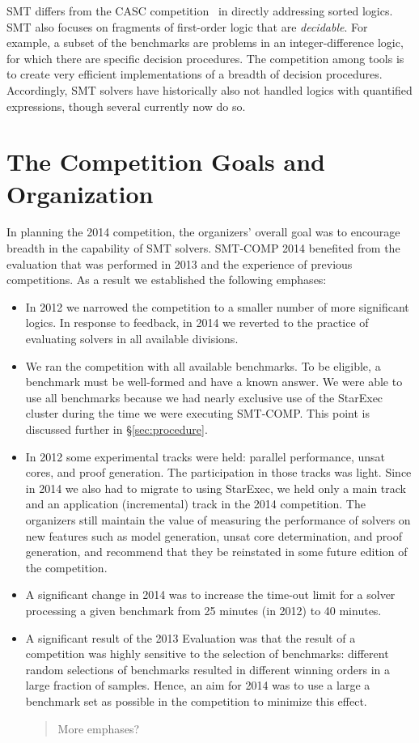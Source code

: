 \documentclass[twoside,11pt]{article}
\newcommand{\comment}[2]{\begin{quote}\sc #1\marginpar{\textcolor{red}{$\ast^{\mbox{#2}}$}}\end{quote}}
\newcommand{\davidc}[1]{\comment{#1}{DC}}
\begin{document}
SMT differs from the CASC competition~\cite{PSS02} in directly addressing sorted logics. SMT also focuses on fragments of first-order logic that are \textit{decidable}. For example, a subset of the benchmarks are problems in an integer-difference logic, for which there are specific decision procedures. The competition among tools is to create very efficient implementations of a breadth of decision procedures. Accordingly, SMT solvers have historically also not handled logics with quantified expressions, though several currently now do so.

\section{The Competition Goals and Organization}
\label{sec:goals}

In planning the 2014 competition, the organizers' overall goal was to encourage breadth
in the capability of SMT solvers. SMT-COMP 2014 benefited from the evaluation that was performed in 2013 and the experience of previous competitions. As a result we established the following emphases:
\begin{itemize}
\item In 2012 we narrowed the competition to a smaller number of more significant logics. In response to feedback, in 2014 we reverted to the practice of evaluating solvers in all available divisions.
\item We ran the competition with all available benchmarks. To be eligible, a benchmark must be well-formed and have a known answer. We were able to use all benchmarks because we had nearly exclusive use of the StarExec cluster during the time we were executing SMT-COMP. This point is discussed further in \S\ref{sec:procedure}.
\item In 2012 some experimental tracks were held: parallel performance, unsat cores, and proof generation. The participation in those tracks was light. Since in 2014 we also had to migrate to using StarExec, we held only a main track and an application (incremental) track in the 2014 competition. The organizers still maintain the value of measuring the performance of solvers on new features such as model generation, unsat core determination, and proof generation, and recommend that they be reinstated in some future edition of the competition.
\item A significant change in 2014 was to increase the time-out limit for a solver processing a given benchmark from 25 minutes (in 2012) to 40 minutes.
\item A significant result of the 2013 Evaluation was that the result of a competition was highly sensitive to the selection of benchmarks: different random selections of benchmarks resulted in different winning orders in a large fraction of samples. Hence, an aim for 2014 was to use a large a benchmark set as possible in the competition to minimize this effect.

\davidc{More emphases?}


\end{itemize}
\end{document}
